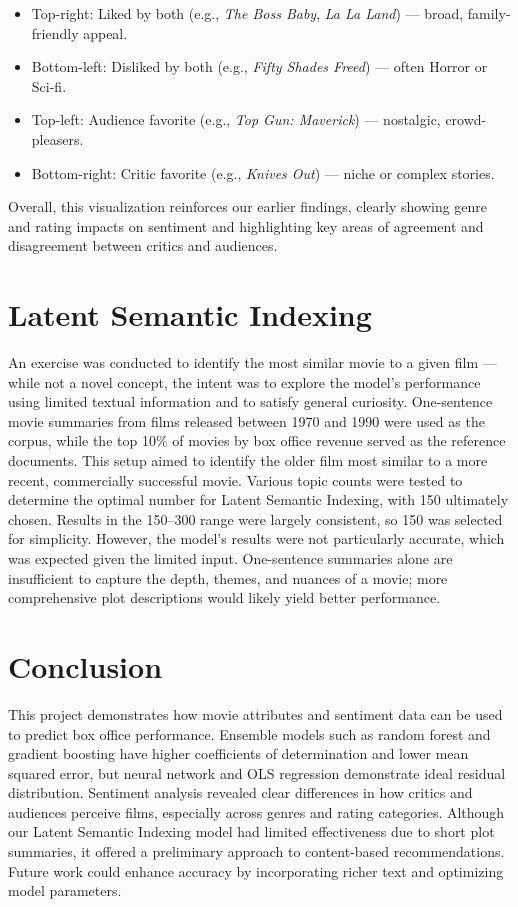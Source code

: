 \documentclass{article}
\begin{document}
\begin{itemize}
\item Top-right: Liked by both (e.g., \textit{The Boss Baby}, \textit{La La Land}) — broad, family-friendly appeal.
\item Bottom-left: Disliked by both (e.g., \textit{Fifty Shades Freed}) — often Horror or Sci-fi.
\item Top-left: Audience favorite (e.g., \textit{Top Gun: Maverick}) — nostalgic, crowd-pleasers.
\item Bottom-right: Critic favorite (e.g., \textit{Knives Out}) — niche or complex stories.
\end{itemize}


Overall, this visualization reinforces our earlier findings, clearly showing genre and rating impacts on sentiment and highlighting key areas of agreement and disagreement between critics and audiences.

\section{Latent Semantic Indexing}
An exercise was conducted to identify the most similar movie to a given film — while not a novel concept, the intent was to explore the model’s performance using limited textual information and to satisfy general curiosity. One-sentence movie summaries from films released between 1970 and 1990 were used as the corpus, while the top 10\% of movies by box office revenue served as the reference documents. This setup aimed to identify the older film most similar to a more recent, commercially successful movie.
Various topic counts were tested to determine the optimal number for Latent Semantic Indexing, with 150 ultimately chosen. Results in the 150–300 range were largely consistent, so 150 was selected for simplicity.
However, the model's results were not particularly accurate, which was expected given the limited input. One-sentence summaries alone are insufficient to capture the depth, themes, and nuances of a movie; more comprehensive plot descriptions would likely yield better performance.

\section{Conclusion}
This project demonstrates how movie attributes and sentiment data can be used to predict box office performance. Ensemble models such as random forest and gradient boosting have higher coefficients of determination and lower mean squared error, but neural network and OLS regression demonstrate ideal residual distribution. Sentiment analysis revealed clear differences in how critics and audiences perceive films, especially across genres and rating categories. Although our Latent Semantic Indexing model had limited effectiveness due to short plot summaries, it offered a preliminary approach to content-based recommendations. Future work could enhance accuracy by incorporating richer text and optimizing model parameters.
\end{document}
